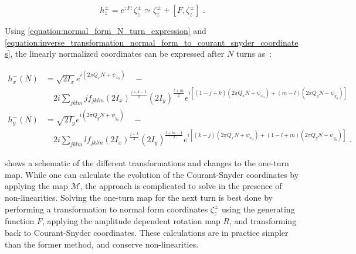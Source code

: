 \begin{equation}
    h_z^{\pm} = e^{:F:} \zeta_z^{\pm} \simeq \zeta_z^{\pm} + \left[ F, \zeta_z^{\pm} \right] \text{ .}
    \label{equation:inverse_transformation_normal_form_to_courant_snyder_coordinates}
\end{equation}

Using \cref{equation:normal_form_N_turn_expression} and \cref{equation:inverse_transformation_normal_form_to_courant_snyder_coordinates}, the linearly normalized coordinates can be expressed after \(N\) turns as~\cite{PHD:Franchi,CERN:Bartolini:Normal_Form_Tracking_Beam_Data}:

\begin{equation}
    \begin{aligned}
        h_x^{-}(N) & = \sqrt{2 I_x} e^{i \left( 2 \pi Q_x N + \psi_{x_0} \right)} \quad - \\
        & \quad 2 i \sum_{jklm} j f_{jklm} \left( 2 I_x \right)^{\frac{j+k-1}{2}} \left( 2 I_y \right)^{\frac{l+m}{2}}   e^{i \left[ (1-j+k) \left( 2 \pi Q_x N + \psi_{x_0} \right) + (m-l)   \left( 2 \pi Q_y N - \psi_{y_0} \right) \right]} \\
        h_y^{-}(N) & = \sqrt{2 I_y} e^{i \left( 2 \pi Q_y N + \psi_{y_0} \right)} \quad - \\
        & \quad 2 i \sum_{jklm} l f_{jklm} \left( 2 I_x \right)^{\frac{j+k}{2}}   \left( 2 I_y \right)^{\frac{l+m-1}{2}} e^{i \left[ (k-j)   \left( 2 \pi Q_x N + \psi_{x_0} \right) + (1-l+m) \left( 2 \pi Q_y N - \psi_{y_0} \right) \right]} \text{ .}
    \end{aligned}
    \label{equation:linearly_normalized_coordinates_after_N_turns}
\end{equation}

 shows a schematic of the different transformations and changes to the one-turn map.
While one can calculate the evolution of the Courant-Snyder coordinates by applying the map \(\mathcal{M}\), the approach is complicated to solve in the presence of non-linearities.
Solving the one-turn map for the next turn is best done by performing a transformation to normal form coordinates \(\zeta_{z}^{\pm}\) using the generating function \(F\), applying the amplitude dependent rotation map \(R\), and transforming back to Courant-Snyder coordinates.
These calculations are in practice simpler than the former method, and conserve non-linearities.

